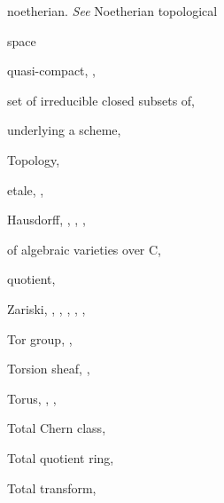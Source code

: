 {{\noindent\hspace*{7.5bp}noetherian. \emph{See} Noetherian topological\par
\noindent\hspace*{15.0bp}space\par
\noindent\hspace*{7.5bp}quasi-compact, , \par
\noindent\hspace*{7.5bp}set of irreducible closed subsets of, \par
\noindent\hspace*{7.5bp}underlying a scheme, \par
\noindent\hspace*{0.0bp}Topology,\par
\noindent\hspace*{7.5bp}etale, , \par
\noindent\hspace*{7.5bp}Hausdorff, , , , \par
\noindent\hspace*{7.5bp}of algebraic varieties over C, \par
\noindent\hspace*{7.5bp}quotient, \par
\noindent\hspace*{7.5bp}Zariski, , , , , , \par
}\hfill%
\parbox[t]{162.5bp}{\fontsize{8.05}{8.49}\selectfont%
\raggedright\setlength{\parskip}{0pt}%
\noindent\hspace*{0.0bp}Tor group, , \par
\noindent\hspace*{0.0bp}Torsion sheaf, , \par
\noindent\hspace*{0.0bp}Torus, , , \par
\noindent\hspace*{0.0bp}Total Chern class, \par
\noindent\hspace*{0.0bp}Total quotient ring, \par
\noindent\hspace*{0.0bp}Total transform, \par
}}
